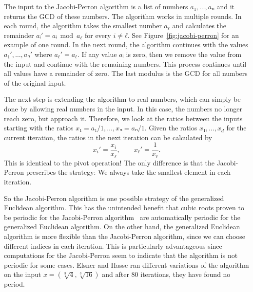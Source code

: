 The input to the Jacobi-Perron algorithm is a list of numbers $a₁, …, aₙ$ and
it returns the GCD of these numbers.
The algorithm works in multiple rounds.
In each round, the algorithm takes the smallest number $a_ℓ$ and calculates the
remainder $aᵢ' = aᵢ \bmod a_ℓ$ for every $i ≠ ℓ$.
See Figure~\ref{fig:jacobi-perron} for an example of one round.
In the next round, the algorithm continues with the values $a₁', …, aₙ'$ where $a_ℓ' = a_ℓ$.
If any value $aᵢ$ is zero, then we remove the value from the input and continue
with the remaining numbers.
This process continues until all values have a remainder of zero.
The last modulus is the GCD for all numbers of the original input.

The next step is extending the algorithm to real numbers,
which can simply be done by allowing real numbers in the input.
In this case, the numbers no longer reach zero, but approach it.
Therefore, we look at the ratios between the inputs starting with the ratios $x₁ = a₁/1, …, xₙ = aₙ/1$.
Given the ratios $x₁, …, x_d$ for the current iteration,
the ratios in the next iteration can be calculated by
\[
  x_i' = \frac{x_i}{x_ℓ}, \qquad x_ℓ' = \frac{1}{x_ℓ}.
\]
This is identical to the pivot operation!
The only difference is that the Jacobi-Perron prescribes the strategy:
We always take the smallest element in each iteration.

So the Jacobi-Perron algorithm is one possible strategy of the generalized
Euclidean algorithm.
This has the unintended benefit that cubic roots proven to be periodic for the
Jacobi-Perron algorithm~\cite{Bernstein64,Bernstein71} are automatically
periodic for the generalized Euclidean algorithm.
On the other hand,
the generalized Euclidean algorithm is more flexible than the Jacobi-Perron
algorithm, since we can choose different indices in each iteration.
This is particularly advantageous since computations for the Jacobi-Perron
seem to indicate that the algorithm is not periodic for some
cases.
Elsner and Hasse \cite{Elsner67} ran different variations of the algorithm on
the input $x = (\sqrt[3]{4}, \sqrt[3]{16})$ and after 80 iterations, they have
found no period.
